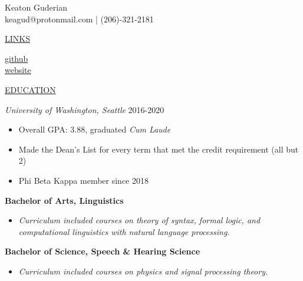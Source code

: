 \documentclass[11pt]{article}
\newcommand{\resumetitle}[3]{
    \AddToShipoutPictureBG{
        \AtPageUpperLeft {
        \raisebox{-0.09\paperheight}{
            \color{black!85}\rule{2\paperwidth}{\paperheight}}
        }}
    \begin{Center}
        \begingroup
        \titlethin
        \color{black!10}\Huge{#1}
        \titlethick
        \color{black!5}\Huge{#2} \\
        \vspace{2mm}
        \textrm{\color{black!15}\Large{#3}}
        \endgroup
    \end{Center}
    \vspace{7mm}
}
\newcommand{\betteruline}[1]{
    \uline{#1}
}
\newcommand{\sectiontitle}[1]{
    \begingroup
        \titlebold
        \betteruline{\Large\uppercase{#1}  }
        \vspace{1.7mm}
    \endgroup
}
\newcommand{\sectioncontent}[1]{
    \begingroup
        \begin{FlushLeft}
        \vspace{-3mm}
        \sffamily\small#1
        \end{FlushLeft}
    \endgroup
    \vspace{2mm}
}
\newcommand{\honor}[2]{
    \textcolor{black!70}{#1} - #2 \\
    \vspace{1.5mm}
}
\begin{document}
    \resumetitle{Keaton}{Guderian} {
      keagud@protonmail.com | (206)-321-2181
    }

    \setlength{\columnsep}{7mm}
    \begin{paracol}{2}

    \sectiontitle{links}
    \sectioncontent{
        \hspace{2mm}
        \href{https://github.com/keagud}{github} \\
        \faIcon{link}\hspace{1.8mm}
        \href{example.com}{website}
    }

    \iffalse

    \sectiontitle{Honors \& Awards}
    \sectioncontent{
        \honor{Date}{Lacus suspendisse faucibus interdum posuere lorem ipsum dolor sit amet.}
        \honor{Date}{ Libero justo laoreet sit amet cursus sit amet.}
        \honor{Date}{ Est velit egestas dui id ornare arcu odio ut sem. Phasellus vestibulum lorem sed risus ultricies tristique nulla aliquet.}
    }
      \fi
    \sectiontitle{education}
    \sectioncontent{
        \begingroup
      \textit{University of Washington, Seattle }\hfill\color{black!70}\small{2016-2020}
        \endgroup
      \begin{itemize}
      \item Overall GPA: 3.88, graduated \textit{Cum Laude}
      \item Made the Dean's List for every term that met the credit requirement (all but 2)
      \item Phi Beta Kappa member since 2018
        \end{itemize}
      \item \textbf{Bachelor of Arts, Linguistics }
        \begin{itemize}
          \item \textit{Curriculum included courses on theory of syntax, formal logic, and computational linguistics with natural language processing. }

        \end{itemize}
      \item \textbf{Bachelor of Science, Speech \& Hearing Science}
        \begin{itemize}
          \item \textit{Curriculum included courses on physics and signal processing theory.}
        \end{itemize}

}
\end{paracol}
\end{document}
